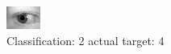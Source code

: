 \begin{figure}[h!]
\begin{center}
\includegraphics[width=0.60\columnwidth]{figures/ID816_class_2_target_4.png}
\end{center}
\caption{ Classification: 2 actual target: 4}
\label{fig:ID816_class_2_target_4}
\end{figure}
